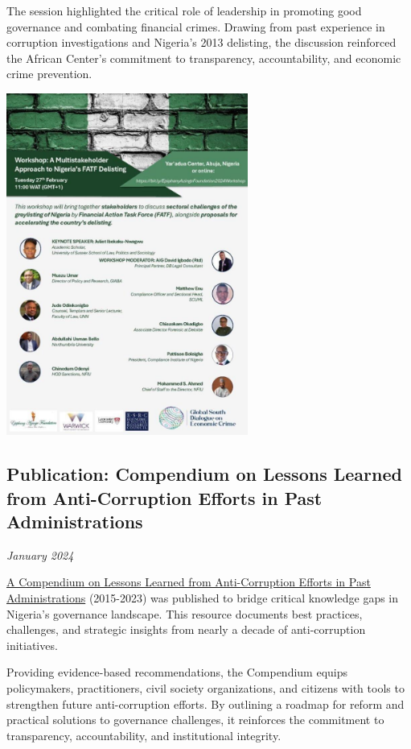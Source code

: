 \documentclass[
  letterpaper,
  DIV=11,
  numbers=noendperiod]{scrreprt}
\begin{document}
The session highlighted the critical role of leadership in promoting
good governance and combating financial crimes. Drawing from past
experience in corruption investigations and Nigeria's 2013 delisting,
the discussion reinforced the African Center's commitment to
transparency, accountability, and economic crime prevention.

\begin{center}
\includegraphics[width=3.125in,height=\textheight,keepaspectratio]{images/strengthen/03_aml.jpg}
\end{center}

\subsection{Publication: Compendium on Lessons Learned from
Anti-Corruption Efforts in Past
Administrations}\label{publication-compendium-on-lessons-learned-from-anti-corruption-efforts-in-past-administrations}

\emph{January 2024}

\href{https://africancenterdev.org/resources/our-publications/compendium/}{A
Compendium on Lessons Learned from Anti-Corruption Efforts in Past
Administrations} (2015-2023) was published to bridge critical knowledge
gaps in Nigeria's governance landscape. This resource documents best
practices, challenges, and strategic insights from nearly a decade of
anti-corruption initiatives.

Providing evidence-based recommendations, the Compendium equips
policymakers, practitioners, civil society organizations, and citizens
with tools to strengthen future anti-corruption efforts. By outlining a
roadmap for reform and practical solutions to governance challenges, it
reinforces the commitment to transparency, accountability, and
institutional integrity.
\end{document}
